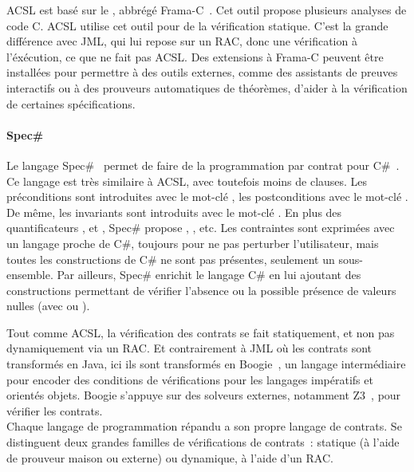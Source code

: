 ACSL est basé sur le , abbrégé
Frama-C~. Cet outil propose plusieurs analyses de code C. ACSL
utilise cet outil pour de la vérification statique. C'est la grande différence
avec JML, qui lui repose sur un RAC, donc une vérification à l'éxécution, ce que
ne fait pas ACSL. Des extensions à Frama-C peuvent être installées pour
permettre à des outils externes, comme des assistants de preuves interactifs ou
à des prouveurs automatiques de théorèmes, d'aider à la vérification de
certaines spécifications.

\paragraph{Spec\#} Le langage Spec\#~ permet de faire de la
programmation par contrat pour C\#~. Ce langage est très similaire
à ACSL, avec toutefois moins de clauses. Les préconditions sont introduites avec
le mot-clé , les postconditions avec le mot-clé .
De même, les invariants sont introduits avec le mot-clé . En
plus des quantificateurs ,  et ,
Spec\# propose , ,  etc. Les contraintes sont
exprimées avec un langage proche de C\#, toujours pour ne pas perturber
l'utilisateur, mais toutes les constructions de C\# ne sont pas présentes,
seulement un sous-ensemble.  Par ailleurs, Spec\# enrichit le langage C\# en lui
ajoutant des constructions permettant de vérifier l'absence ou la possible
présence de valeurs nulles (avec \code{!} ou ).

Tout comme ACSL, la vérification des contrats se fait statiquement, et non pas
dynamiquement via un RAC. Et contrairement à JML où les contrats sont
transformés en Java, ici ils sont transformés en Boogie~,
un langage intermédiaire pour encoder des conditions de vérifications pour les
langages impératifs et orientés objets. Boogie s'appuye sur des solveurs
externes, notamment Z3~, pour vérifier les contrats. \\

Chaque langage de programmation répandu a son propre langage de contrats. Se
distinguent deux grandes familles de vérifications de contrats~: statique (à
l'aide de prouveur maison ou externe) ou dynamique, à l'aide d'un RAC. \\



